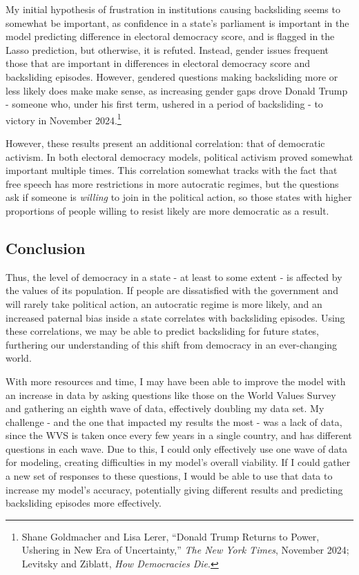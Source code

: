 \documentclass[
  letterpaper,
  DIV=11,
  numbers=noendperiod]{scrartcl}
\begin{document}
My initial hypothesis of frustration in institutions causing backsliding
seems to somewhat be important, as confidence in a state's parliament is
important in the model predicting difference in electoral democracy
score, and is flagged in the Lasso prediction, but otherwise, it is
refuted. Instead, gender issues frequent those that are important in
differences in electoral democracy score and backsliding episodes.
However, gendered questions making backsliding more or less likely does
make make sense, as increasing gender gaps drove Donald Trump - someone
who, under his first term, ushered in a period of backsliding - to
victory in November 2024.\footnote{Shane Goldmacher and Lisa Lerer,
  {``Donald {Trump Returns} to {Power}, {Ushering} in {New Era} of
  {Uncertainty},''} \emph{The New York Times}, November 2024; Levitsky
  and Ziblatt, \emph{How {Democracies Die}}.}

However, these results present an additional correlation: that of
democratic activism. In both electoral democracy models, political
activism proved somewhat important multiple times. This correlation
somewhat tracks with the fact that free speech has more restrictions in
more autocratic regimes, but the questions ask if someone is
\emph{willing} to join in the political action, so those states with
higher proportions of people willing to resist likely are more
democratic as a result.

\subsection{Conclusion}\label{conclusion}

Thus, the level of democracy in a state - at least to some extent - is
affected by the values of its population. If people are dissatisfied
with the government and will rarely take political action, an autocratic
regime is more likely, and an increased paternal bias inside a state
correlates with backsliding episodes. Using these correlations, we may
be able to predict backsliding for future states, furthering our
understanding of this shift from democracy in an ever-changing world.

With more resources and time, I may have been able to improve the model
with an increase in data by asking questions like those on the World
Values Survey and gathering an eighth wave of data, effectively doubling
my data set. My challenge - and the one that impacted my results the
most - was a lack of data, since the WVS is taken once every few years
in a single country, and has different questions in each wave. Due to
this, I could only effectively use one wave of data for modeling,
creating difficulties in my model's overall viability. If I could gather
a new set of responses to these questions, I would be able to use that
data to increase my model's accuracy, potentially giving different
results and predicting backsliding episodes more effectively.
\end{document}
